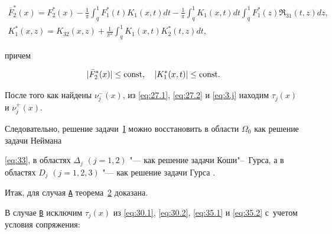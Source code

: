 \begin{gather}

\bar F_2^*(x) = F_2^*(x) - \frac{1}{\pi } \int _q^1 {F_{1}^*(t){K_1}(x,t)dt - \frac{1}{\pi } \int _q^1 {{K_1}(x,t)dt}  \int _q^1 {F_1^*(z){\Re_{31}}(t,z)dz} }, \\

K_1^ * (x,z) = K_{32}^{}(x,z) + \frac{1}{{{\pi ^2}}} \int _q^1 {{K_1}(x,t)K_2^*(t,z)dt}, 

\end{gather}

причем   

$$| {\bar F_2^ * (x)} | \le {\rm const}, \quad | {K_1^ * (x,t)} | \le \rm const.$$



После того как найдены ${\nu^{-} _j}(x)$, из \eqref{eq:27.1}, \eqref{eq:27.2} и \eqref{eq:3.j} находим  ${\tau _j}(x)$ и ${\nu^{+} _j}(x)$. 

Следовательно, решение задачи~\hyperlink{abd:taskI}{I} можно восстановить в области ${\Omega _0}$ как решение задачи Неймана 

 \eqref{eq:33},  в областях $\Delta _j$ $(j = 1, 2)$ "--- как решение задачи Коши"--~Гурса, а в областях $D_j$ $(j = 1, 2, 3)$ "--- как решение задачи Гурса \cite{Islabd:bib:Islomabdul}. 

Итак, для случая   \hyperlink{abd:A}{\tt А} теорема~\hyperlink{abd:th2}{2} доказана.



\smallskip



В случае \hyperlink{abd:B}{\tt B} исключим ${\tau _j}(x)$ из \eqref{eq:30.1}, \eqref{eq:30.2}, \eqref{eq:35.1} и \eqref{eq:35.2} с~учетом условия сопряжения:

